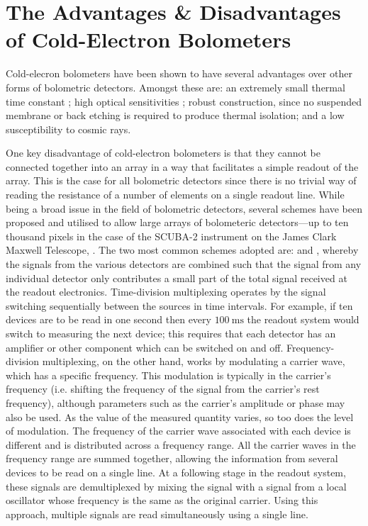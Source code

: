 \section{The Advantages \& Disadvantages of Cold-Electron Bolometers} 
\label{sec:advantages} 
Cold-elecron bolometers have been shown to have several advantages over other forms of bolometric detectors. Amongst these are: an extremely small thermal time constant \parencite[][shows that there is the potential for this to be as low as $10~\mathrm{ns}$]{Kuzmin2004}; high optical sensitivities \parencite[][achieved a noise-equivalent power of $3.5 \times 10^{-17}~\mathrm{W\,Hz}^{\nicefrac{-1}{2}}$, although this was limited by the readout amplifier]{Otto2013}; robust construction, since no suspended membrane or back etching is required to produce thermal isolation; and \parencite[as shown by][]{Salatino2014} a low susceptibility to cosmic rays.
\par 
One key disadvantage of cold-electron bolometers is that they cannot be connected together into an array in a way that facilitates a simple readout of the array. This is the case for all bolometric detectors since there is no trivial way of reading the resistance of a number of elements on a single readout line. While being a broad issue in the field of bolometric detectors, several schemes have been proposed and utilised to allow large arrays of bolometeric detectors---up to ten thousand pixels in the case of the SCUBA-2 instrument on the James Clark Maxwell Telescope, \textcite{Holland2013}. The two most common schemes adopted are:  and , whereby the signals from the various detectors are combined such that the signal from any individual detector only contributes a small part of the total signal received at the readout electronics. Time-division multiplexing operates by the signal switching sequentially between the sources in time intervals. For example, if ten devices are to be read in one second then every $100~\mathrm{ms}$ the readout system would switch to measuring the next device; this requires that each detector has an amplifier or other component which can be switched on and off. Frequency-division multiplexing, on the other hand, works by modulating a carrier wave, which has a specific frequency. This modulation is typically in the carrier's frequency (i.e. shifting the frequency of the signal from the carrier's rest frequency), although parameters such as the carrier's amplitude or phase may also be used. As the value of the measured quantity varies, so too does the level of modulation. The frequency of the carrier wave associated with each device is different and is distributed across a frequency range. All the carrier waves in the frequency range are summed together, allowing the information from several devices to be read on a single line. At a following stage in the readout system, these signals are demultiplexed by mixing the signal with a signal from a local oscillator whose frequency is the same as the original carrier. Using this approach, multiple signals are read simultaneously using a single line.
